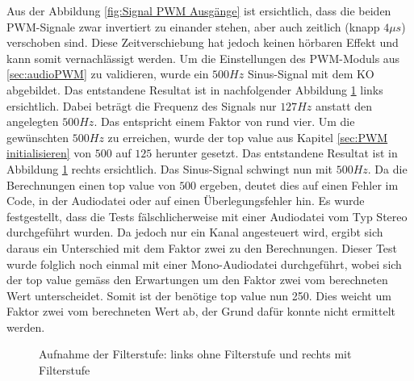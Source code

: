 Aus der Abbildung \ref{fig:Signal PWM Ausgänge} ist ersichtlich, dass die beiden PWM-Signale zwar invertiert zu einander stehen, aber auch zeitlich (knapp $4\mu s$) verschoben sind. Diese Zeitverschiebung hat jedoch keinen hörbaren Effekt und kann somit vernachlässigt werden. Um die Einstellungen des PWM-Moduls aus \ref{sec:audioPWM} zu validieren, wurde ein $500Hz$ Sinus-Signal mit dem KO abgebildet. Das entstandene Resultat ist in nachfolgender Abbildung \ref{fig:PWM Topval 500 Stereo} links ersichtlich. Dabei beträgt die Frequenz des Signals nur $127Hz$ anstatt den angelegten $500Hz$. Das entspricht einem Faktor von rund vier. Um die gewünschten $500Hz$ zu erreichen, wurde der top value aus Kapitel \ref{sec:PWM initialisieren} von $500$ auf $125$ herunter gesetzt. Das entstandene Resultat ist in Abbildung \ref{fig:PWM Topval 500 Stereo} rechts ersichtlich. Das Sinus-Signal schwingt nun mit $500Hz$. Da die Berechnungen einen top value von $500$ ergeben, deutet dies auf einen Fehler im Code, in der Audiodatei oder auf einen Überlegungsfehler hin. Es wurde festgestellt, dass die Tests fälschlicherweise mit einer Audiodatei vom Typ Stereo durchgeführt wurden. Da jedoch nur ein Kanal angesteuert wird, ergibt sich daraus ein Unterschied mit dem Faktor zwei zu den Berechnungen. Dieser Test wurde folglich noch einmal mit einer Mono-Audiodatei durchgeführt, wobei sich der top value gemäss den Erwartungen um den Faktor zwei vom berechneten Wert unterscheidet. Somit ist der benötige top value nun 250. Dies weicht um Faktor zwei vom berechneten Wert ab, der Grund dafür konnte nicht ermittelt werden.

\begin{figure}[htbp]
	\centering
	\quad
	\quad
	\caption[PWM auf $128kHz$ eingestellt]{Aufnahme der Filterstufe: links ohne Filterstufe und rechts mit Filterstufe}
	\label{fig:PWM Topval 500 Stereo}
\end{figure}

